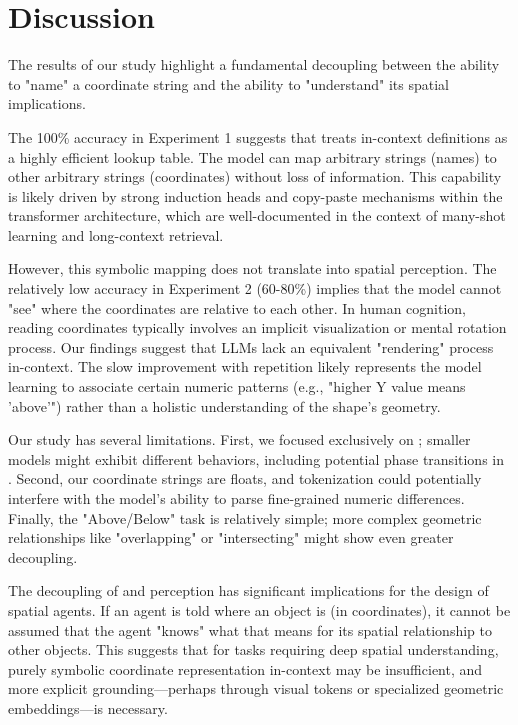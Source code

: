 \section{Discussion}
\label{sec:discussion}

The results of our study highlight a fundamental decoupling between the ability to "name" a coordinate string and the ability to "understand" its spatial implications.

The 100\% accuracy in Experiment 1 suggests that \gpt treats in-context definitions as a highly efficient lookup table. The model can map arbitrary strings (names) to other arbitrary strings (coordinates) without loss of information. This capability is likely driven by strong induction heads and copy-paste mechanisms within the transformer architecture, which are well-documented in the context of many-shot learning and long-context retrieval.

However, this symbolic mapping does not translate into spatial perception. The relatively low accuracy in Experiment 2 (60-80\%) implies that the model cannot "see" where the coordinates are relative to each other. In human cognition, reading coordinates typically involves an implicit visualization or mental rotation process. Our findings suggest that LLMs lack an equivalent "rendering" process in-context. The slow improvement with repetition likely represents the model learning to associate certain numeric patterns (e.g., "higher Y value means 'above'") rather than a holistic understanding of the shape's geometry.

Our study has several limitations. First, we focused exclusively on \gpt; smaller models might exhibit different behaviors, including potential phase transitions in \addressing. Second, our coordinate strings are floats, and tokenization could potentially interfere with the model's ability to parse fine-grained numeric differences. Finally, the "Above/Below" task is relatively simple; more complex geometric relationships like "overlapping" or "intersecting" might show even greater decoupling.

The decoupling of \addressing and perception has significant implications for the design of spatial agents. If an agent is told where an object is (in coordinates), it cannot be assumed that the agent "knows" what that means for its spatial relationship to other objects. This suggests that for tasks requiring deep spatial understanding, purely symbolic coordinate representation in-context may be insufficient, and more explicit grounding—perhaps through visual tokens or specialized geometric embeddings—is necessary.
